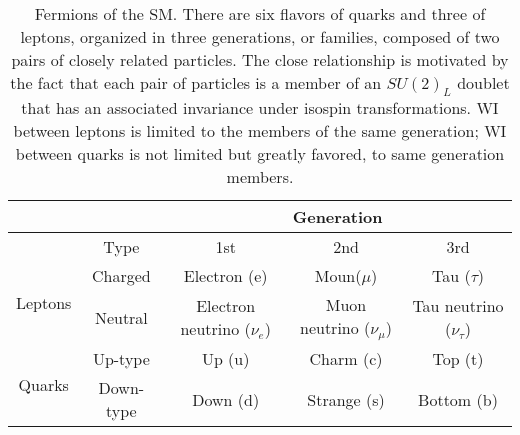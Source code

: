\begin{center}
\begin{table}[h!]
\centering
\footnotesize
\begin{tabular}{ccccc} \hline
                         &         & \multicolumn{3}{c}{Generation}                                                           \\ \hline
                         &Type     & 1st                          & 2nd                        & 3rd                          \\ \hline
\multirow{2}{*}{Leptons} &Charged  & Electron (e)                 & Moun($\mu$)                & Tau ($\tau$)                 \\%
                         &Neutral  & Electron neutrino ($\nu_e$)  & Muon neutrino ($\nu_{\mu}$) & Tau neutrino ($\nu_{\tau}$) \\\hline
\multirow{2}{*}{Quarks}  &Up-type  & Up (u)                       & Charm (c)                & Top (t)                        \\%
                         &Down-type& Down (d)                     & Strange (s)              & Bottom (b)                     \\\hline
\end{tabular}
\caption[Fermions of the SM.]{Fermions of the SM. There are six flavors of quarks and three of leptons, organized in three generations, or families, composed of two pairs of closely related particles. The close relationship is motivated by the fact that each pair of particles is a member of an $SU(2)_L$ doublet that has an associated invariance under isospin transformations. WI between leptons is limited to the members of the same generation; WI between quarks is not limited but greatly favored, to same generation members. }\label{flav_gen}
\end{table}
\end{center}

